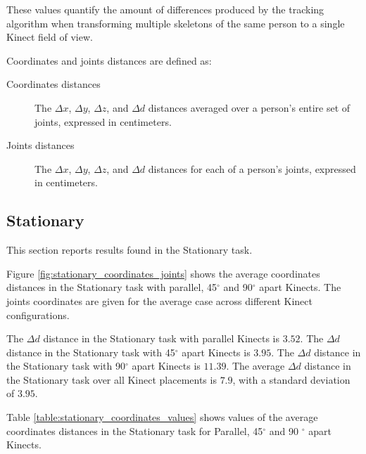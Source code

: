 These values quantify the amount of differences produced by the tracking algorithm when transforming multiple skeletons of the same person to a single Kinect field of view.

Coordinates and joints distances are defined as:

\begin{description}
  \item[Coordinates distances] The $\Delta x$, $\Delta y$, $\Delta z$, and $\Delta d$ distances averaged over a person's entire set of joints, expressed in centimeters.
  \item[Joints distances] The $\Delta x$, $\Delta y$, $\Delta z$, and $\Delta d$ distances for each of a person's joints, expressed in centimeters. 
\end{description}

% 
% 
\subsection{Stationary}

This section reports results found in the Stationary task.

Figure \ref{fig:stationary_coordinates_joints} shows the average coordinates distances in the Stationary task with parallel, 45$^{\circ}$ and 90$^{\circ}$ apart Kinects. The joints coordinates are given for the average case across different Kinect configurations.

The $\Delta d$ distance in the Stationary task with parallel Kinects is $3.52$. The $\Delta d$ distance in the Stationary task with 45$^{\circ}$ apart Kinects is $3.95$. The $\Delta d$ distance in the Stationary task with 90$^{\circ}$ apart Kinects is $11.39$. The average $\Delta d$ distance in the Stationary task over all Kinect placements is $7.9$, with a standard deviation of $3.95$.


\begin{figure*}[!htb]
  \centering

  
  

  \caption{Average coordinates distances in the Stationary task with Parallel, 45$^{\circ}$ and 90 $^{\circ}$ apart Kinects. The joints distances are given for the average case.}

  \label{fig:stationary_coordinates_joints}
\end{figure*}

Table \ref{table:stationary_coordinates_values} shows values of the average coordinates distances in the Stationary task for Parallel, 45$^{\circ}$ and 90 $^{\circ}$ apart Kinects.

